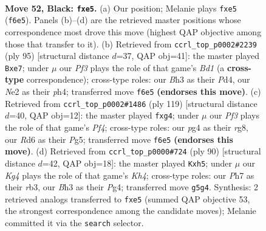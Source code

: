 \documentclass[11pt]{article}
\begin{document}
\clearpage

\begin{figure}[p]\centering
\begin{subfigure}{0.46\textwidth}\centering
\resizebox{\linewidth}{!}{%
\newchessgame
\chessboard[
  setfen={8/7p/3r1p2/4P1k1/1p4P1/4K2b/4n1r1/8 b - - 0 52},
  showmover=false,
  pgfstyle=straightmove, color=movearrow, markmove={f6-e5}
]}
\caption{}
\end{subfigure}\hfill
\begin{subfigure}{0.46\textwidth}\centering
\resizebox{\linewidth}{!}{%
\newchessgame
\chessboard[
  setfen={3b1r2/4P1k1/8/3p1P2/3p3P/3r4/Q7/7K b - - 0 48},
  showmover=false,
  pgfstyle=straightmove, color=movearrow, markmove={d8-e7}
]}
\caption{}
\end{subfigure}
\\[4pt]
\begin{subfigure}{0.46\textwidth}\centering
\resizebox{\linewidth}{!}{%
\newchessgame
\chessboard[
  setfen={6R1/3k4/8/5pp1/4p1P1/5r2/5PK1/8 b - - 1 60},
  showmover=false,
  pgfstyle=straightmove, color=movearrow, markmove={f5-g4}
]}
\caption{}
\end{subfigure}\hfill
\begin{subfigure}{0.46\textwidth}\centering
\resizebox{\linewidth}{!}{%
\newchessgame
\chessboard[
  setfen={8/8/5k2/6Rp/6PK/1r3P2/8/8 w - - 2 46},
  showmover=false,
  pgfstyle=straightmove, color=movearrow, markmove={h4-h5}
]}
\caption{}
\end{subfigure}
\caption{\textbf{Move 52, Black: \texttt{fxe5}.} (a) Our position; Melanie plays \texttt{fxe5} (\texttt{f6e5}). Panels (b)--(d) are the retrieved master positions whose correspondence most drove this move (highest QAP objective among those that transfer to it). (b) Retrieved from \texttt{ccrl\_top\_p0002\#2239} (ply 95) [structural distance $d$=37, QAP obj=41]: the master played \texttt{Bxe7}; under $\mu$ our \emph{Pf3} plays the role of that game's \emph{Bd1} (a \textbf{cross-type} correspondence); cross-type roles: our \emph{B}h3 as their \emph{P}d4, our \emph{N}e2 as their \emph{p}h4; transferred move \texttt{f6e5} \textbf{(endorses this move)}. (c) Retrieved from \texttt{ccrl\_top\_p0002\#1486} (ply 119) [structural distance $d$=40, QAP obj=12]: the master played \texttt{fxg4}; under $\mu$ our \emph{Pf3} plays the role of that game's \emph{Pf4}; cross-type roles: our \emph{p}g4 as their \emph{r}g8, our \emph{R}d6 as their \emph{P}g5; transferred move \texttt{f6e5} \textbf{(endorses this move)}. (d) Retrieved from \texttt{ccrl\_top\_p0000\#724} (ply 90) [structural distance $d$=42, QAP obj=18]: the master played \texttt{Kxh5}; under $\mu$ our \emph{Kg4} plays the role of that game's \emph{Kh4}; cross-type roles: our \emph{P}h7 as their \emph{r}b3, our \emph{B}h3 as their \emph{P}g4; transferred move \texttt{g5g4}. Synthesis: 2 retrieved analogs transferred to \texttt{fxe5} (summed QAP objective 53, the strongest correspondence among the candidate moves); Melanie committed it via the \texttt{search} selector.}
\label{fig:thought-m103}
\end{figure}
\end{document}
